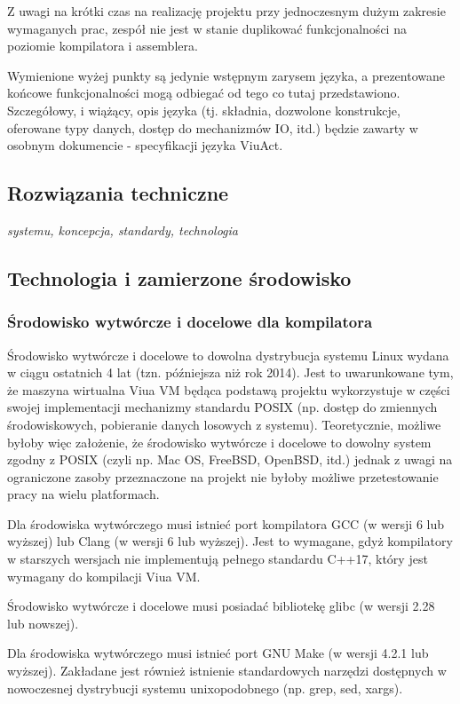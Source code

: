 \documentclass[11pt,oneside,a4paper,titlepage,onecolumn]{article}
\begin{document}
Z uwagi na krótki czas na realizację projektu przy jednoczesnym dużym zakresie wymaganych prac, zespół nie
jest w stanie duplikować funkcjonalności na poziomie kompilatora i assemblera.

Wymienione wyżej punkty są jedynie wstępnym zarysem języka, a prezentowane końcowe funkcjonalności mogą
odbiegać od tego co tutaj przedstawiono. Szczegółowy, i wiążący, opis języka (tj. składnia, dozwolone
konstrukcje, oferowane typy danych, dostęp do mechanizmów IO, itd.) będzie zawarty w osobnym dokumencie -
specyfikacji języka ViuAct.

\subsection{Rozwiązania techniczne}

\emph{systemu, koncepcja, standardy, technologia}

\subsection{Technologia i zamierzone środowisko}
\label{sec:finalenvironment}

\subsubsection{Środowisko wytwórcze i docelowe dla kompilatora}

Środowisko wytwórcze i docelowe to dowolna dystrybucja systemu Linux wydana w ciągu ostatnich 4 lat (tzn.
późniejsza niż rok 2014). Jest to uwarunkowane tym, że maszyna wirtualna Viua VM będąca podstawą projektu
wykorzystuje w części swojej implementacji mechanizmy standardu POSIX (np. dostęp do zmiennych środowiskowych,
pobieranie danych losowych z systemu). Teoretycznie, możliwe byłoby więc założenie, że środowisko wytwórcze i
docelowe to dowolny system zgodny z POSIX (czyli np. Mac OS, FreeBSD, OpenBSD, itd.) jednak z uwagi na
ograniczone zasoby przeznaczone na projekt nie byłoby możliwe przetestowanie pracy na wielu platformach.

Dla środowiska wytwórczego musi istnieć port kompilatora GCC (w wersji 6 lub wyższej) lub Clang (w wersji 6
lub wyższej). Jest to wymagane, gdyż kompilatory w starszych wersjach nie implementują pełnego standardu
C++17, który jest wymagany do kompilacji Viua VM.

Środowisko wytwórcze i docelowe musi posiadać bibliotekę glibc (w wersji 2.28 lub nowszej).

Dla środowiska wytwórczego musi istnieć port GNU Make (w wersji 4.2.1 lub wyższej). Zakładane jest również
istnienie standardowych narzędzi dostępnych w nowoczesnej dystrybucji systemu unixopodobnego (np. grep, sed,
xargs).
\end{document}
